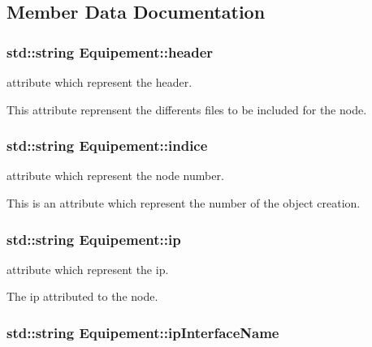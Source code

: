 \subsection{Member Data Documentation}
\hypertarget{class_equipement_1c7ae76643400f1402231514c2a21ae2}{
\subsubsection[{header}]{\setlength{\rightskip}{0pt plus 5cm}std::string {\bf Equipement::header}}}
\label{class_equipement_1c7ae76643400f1402231514c2a21ae2}


attribute which represent the header. 

This attribute reprensent the differents files to be included for the node. \hypertarget{class_equipement_d5124abeb4730c781cf45e7d538ebbc2}{
\subsubsection[{indice}]{\setlength{\rightskip}{0pt plus 5cm}std::string {\bf Equipement::indice}}}
\label{class_equipement_d5124abeb4730c781cf45e7d538ebbc2}


attribute which represent the node number. 

This is an attribute which represent the number of the object creation. \hypertarget{class_equipement_0b1a1b3183ff2e26d5e86adcaa1a151d}{
\subsubsection[{ip}]{\setlength{\rightskip}{0pt plus 5cm}std::string {\bf Equipement::ip}}}
\label{class_equipement_0b1a1b3183ff2e26d5e86adcaa1a151d}


attribute which represent the ip. 

The ip attributed to the node. \hypertarget{class_equipement_3e3703936280f99d55619e7b86810f3b}{
\subsubsection[{ipInterfaceName}]{\setlength{\rightskip}{0pt plus 5cm}std::string {\bf Equipement::ipInterfaceName}}}
\label{class_equipement_3e3703936280f99d55619e7b86810f3b}


